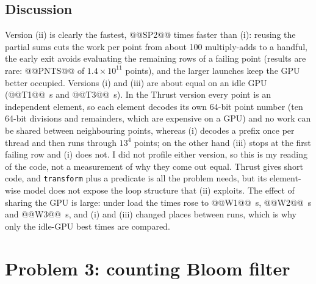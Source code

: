 \documentclass[11pt]{article}
\begin{document}
\subsection*{Discussion}
Version (ii) is clearly the fastest, @@SP2@@ times faster than (i): reusing the
partial sums cuts the work per point from about 100 multiply-adds to a handful,
the early exit avoids evaluating the remaining rows of a failing point (results
are rare: @@PNTS@@ of $1.4\times10^{11}$ points), and the larger launches keep
the GPU better occupied. Versions (i) and (iii) are about equal on an idle GPU
(@@T1@@~s and @@T3@@~s). In the Thrust version every point is an independent
element, so each element decodes its own 64-bit point number (ten 64-bit
divisions and remainders, which are expensive on a GPU) and no work can be
shared between neighbouring points, whereas (i) decodes a prefix once per
thread and then runs through $13^4$ points; on the other hand (iii) stops at
the first failing row and (i) does not. I did not profile either version, so
this is my reading of the code, not a measurement of why they come out equal.
Thrust gives short code, and \texttt{transform} plus a predicate is all the
problem needs, but its element-wise model does not expose the loop structure
that (ii) exploits. The effect of sharing the GPU is large: under load the
times rose to @@W1@@~s, @@W2@@~s and @@W3@@~s, and (i) and (iii) changed places
between runs, which is why only the idle-GPU best times are compared.

\section*{Problem 3: counting Bloom filter}
\end{document}
